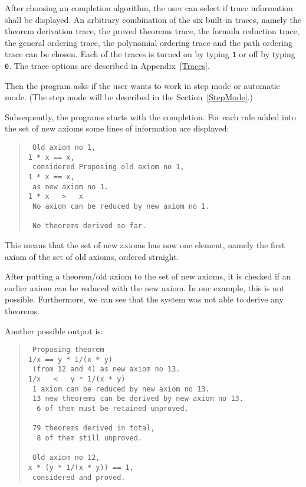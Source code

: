 After choosing an completion algorithm,  the user can select if trace
information shall be displayed.
An arbitrary combination of the 
six built-in traces, namely the theorem derivation trace, the proved theorems
trace, the formula reduction trace, the general ordering trace, the polynomial 
ordering trace and the path ordering trace can be chosen. Each of the traces
is turned on by typing {\tt 1} or off by typing {\tt 0}.
The trace options are described in Appendix~\ref{Traces}.

Then the program asks if the user wants to work in step mode or automatic mode. 
(The step mode will be described in the Section~\ref{StepMode}.)

Subsequently, the programs starts with the completion. For each rule added
into the set of new axioms some lines of information are displayed:
                                                                               
\begin{quote} 
\begin{verbatim}
 Old axiom no 1,
1 * x == x,
 considered Proposing old axiom no 1,
1 * x == x,
 as new axiom no 1.
1 * x   >   x
 No axiom can be reduced by new axiom no 1.

 No theorems derived so far.
\end{verbatim}
\end{quote}
This means that the set of new axioms has now one element, namely the
first axiom of the set of old axioms, ordered straight.
 
After putting a theorem/old axiom to the set of new axioms, it is checked
if an earlier axiom can be reduced with the new axiom. In our example,
this is not possible. Furthermore, we can see that the system was not
able to derive any theorems.
 
Another possible output is:
\begin{quote}
\begin{verbatim} 
 Proposing theorem
1/x == y * 1/(x * y)
 (from 12 and 4) as new axiom no 13.
1/x   <   y * 1/(x * y)
 1 axiom can be reduced by new axiom no 13.
 13 new theorems can be derived by new axiom no 13.
  6 of them must be retained unproved.

 79 theorems derived in total,
  8 of them still unproved.

 Old axiom no 12,
x * (y * 1/(x * y)) == 1,
 considered and proved.
\end{verbatim}
\end{quote} 

